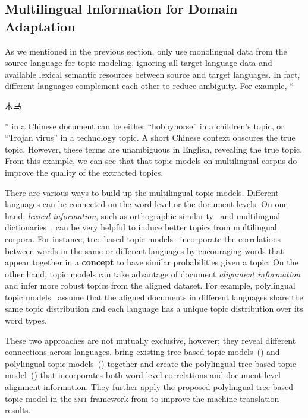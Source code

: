 \subsection{Multilingual Information for Domain Adaptation}
\label{sec:trans-multiling}

As we mentioned in the previous section, \citet{Eidelman-12} only use monolingual data from the source language for topic modeling, ignoring all target-language data and available lexical semantic resources between source and target languages. In fact, different languages complement each other to reduce ambiguity.  For example, ``\begin{CJK*}{UTF8}{gbsn}木马\end{CJK*}'' in a Chinese document can be either ``hobbyhorse'' in a children's topic, or ``Trojan virus'' in a technology topic.  A short Chinese context obscures the true topic. However, these terms are unambiguous in English, revealing the true topic. From this example, we can see that that topic models on multilingual corpus do improve the quality of the extracted topics.

There are various ways to build up the multilingual topic models. Different languages can be connected on the word-level or the document levels. 
On one hand, \emph{lexical information}, such as orthographic similarity~\citep{boyd-graber-09} and multilingual dictionaries~\citep{boyd-graber-10}, can be very helpful to induce better topics from multilingual corpora. For instance, tree-based topic models~\citep{boyd-graber-07,andrzejewski-09,Hu:Boyd-Graber:Satinoff-ur} incorporate the correlations between words in the same or different languages by encouraging words that appear together in a {\bf concept} to have similar probabilities given a topic. 
On the other hand, topic models can take advantage of document \emph{alignment information} and infer more robust topics from the aligned dataset. For example, polylingual topic models~\citep{mimno-09} assume that the aligned documents in different languages share the same topic distribution and each language has a unique topic distribution over its word types. 

These two approaches are not mutually exclusive, however; they reveal different connections across languages. \citet{hu-14} bring existing tree-based topic models~(\tlda{}) and polylingual topic models~(\plda{}) together and create the polylingual tree-based topic model~(\ptlda{}) that incorporates both word-level correlations and document-level alignment information. They further apply the proposed polylingual tree-based topic model in the \textsc{smt} framework from \citet{Eidelman-12} to improve the machine translation results.

